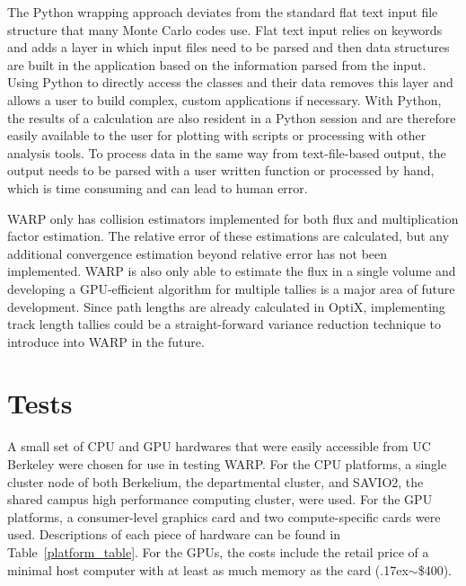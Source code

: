 \documentclass[preprint,12pt]{elsarticle}
\begin{document}
The Python wrapping approach deviates from the standard flat text input file structure that many Monte Carlo codes use.  Flat text input relies on keywords and adds a layer in which input files need to be parsed and then data structures are built in the application based on the information parsed from the input.  Using Python to directly access the classes and their data removes this layer and allows a user to build complex, custom applications if necessary.  With Python, the results of a calculation are also resident in a Python session and are therefore easily available to the user for plotting with scripts or processing with other analysis tools.  To process data in the same way from text-file-based output, the output needs to be parsed with a user written function or processed by hand, which is time consuming and can lead to human error.

WARP only has collision estimators implemented for both flux and multiplication factor estimation.  The relative error of these estimations are calculated, but any additional convergence estimation beyond relative error has not been implemented.  WARP is also only able to estimate the flux in a single volume and developing a GPU-efficient algorithm for multiple tallies is a major area of future development.  Since path lengths are already calculated in OptiX, implementing track length tallies could be a straight-forward variance reduction technique to introduce into WARP in the future.



\section{Tests}
\label{sec:tests}

A small set of CPU and GPU hardwares that were easily accessible from UC Berkeley were chosen for use in testing WARP.  For the CPU platforms, a single cluster node of both Berkelium, the departmental cluster, and SAVIO2, the shared campus high performance computing cluster, were used.  For the GPU platforms, a consumer-level graphics card and two compute-specific cards were used.  Descriptions of each piece of hardware can be found in Table~\ref{platform_table}. For the GPUs, the costs include the retail price of a minimal host computer with at least as much memory as the card ({\raise.17ex\hbox{$\scriptstyle\sim$}}\$400).
  
\end{document}
